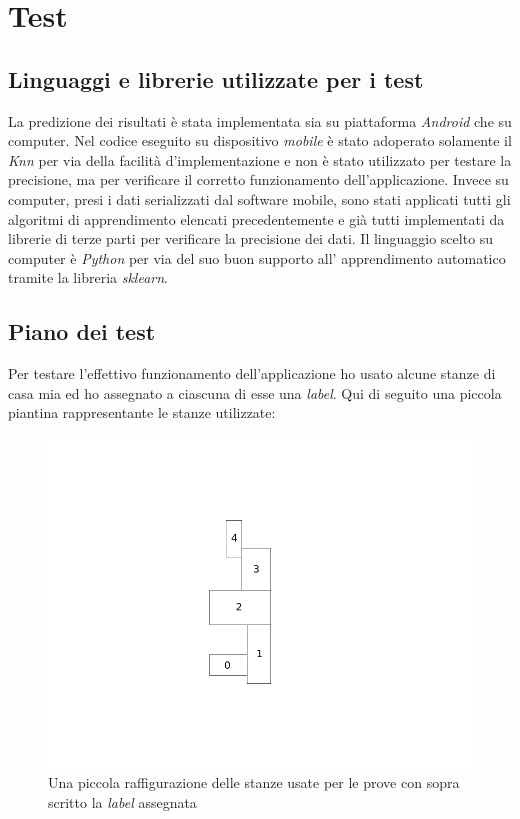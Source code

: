 \chapter{Test}

\section{Linguaggi e librerie utilizzate per i test}
La predizione dei risultati \`e stata implementata sia su piattaforma \textit{Android} che su computer. Nel codice eseguito su dispositivo \textit{mobile} \`e stato adoperato solamente il \textit{Knn} per via della facilit\`a d'implementazione e non \`e stato  utilizzato per testare la precisione, ma per verificare il corretto funzionamento dell'applicazione. Invece su computer, presi i dati serializzati dal software mobile, sono stati applicati tutti gli algoritmi di apprendimento elencati precedentemente e gi\`a tutti implementati da librerie di terze parti per verificare la precisione dei dati. Il linguaggio scelto su computer \`e \textit{Python} per via del suo buon supporto all' apprendimento automatico tramite la libreria \textit{sklearn}.



\section{Piano dei test}
Per testare l'effettivo funzionamento dell'applicazione ho usato alcune stanze di casa mia ed ho assegnato a ciascuna di esse una \textit{label}. Qui di seguito una piccola piantina rappresentante le stanze utilizzate:

\begin{figure}[H]
\centering
\includegraphics[width=0.7\linewidth]{img/test_pianta_casa}
\caption{Una piccola raffigurazione delle stanze usate per le prove con sopra scritto la \textit{label} assegnata}
\label{fig:test_pianta_casa}
\end{figure}

